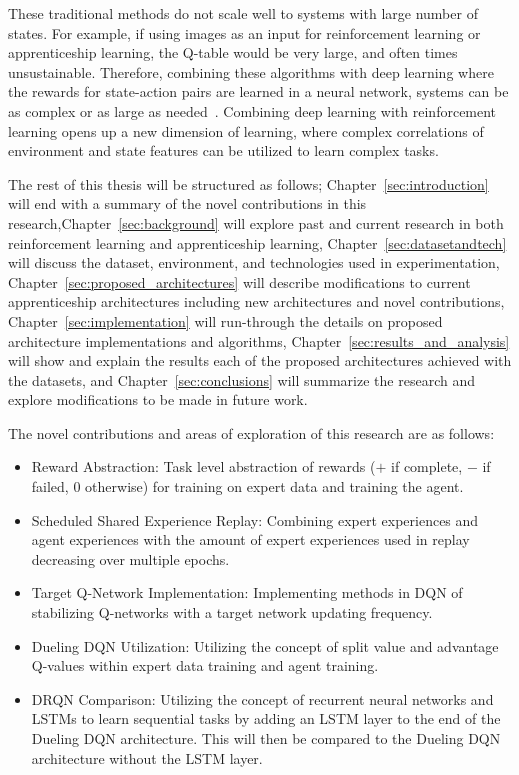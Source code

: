 \documentclass[12pt,american]{report}
\providecommand{\DIFaddtex}[1]{{\protect\color{blue}\uwave{#1}}} %
\providecommand{\DIFaddbegin}{} %
\providecommand{\DIFaddend}{} %
\providecommand{\DIFadd}[1]{\texorpdfstring{\DIFaddtex{#1}}{#1}} %
\newcommand{\DIFaddincludegraphics}[2][]{{\color{blue}\fbox{\DIFOincludegraphics[#1]{#2}}}} %
\DeclareRobustCommand{\DIFaddbegin}{\DIFOaddbegin \let\includegraphics\DIFaddincludegraphics} %
\DeclareRobustCommand{\DIFaddend}{\DIFOaddend \let\includegraphics\DIFOincludegraphics} %
\begin{document}
These traditional methods do not scale well to systems with \DIFaddbegin \DIFadd{a }\DIFaddend large number of states.  For example, if using images as an input for reinforcement learning or apprenticeship learning, the Q-table would be very large, and often times unsustainable.  Therefore, combining these algorithms with deep learning where the rewards for state-action pairs are learned in a neural network, systems can be as complex or as large as needed~\cite{matiisen_2015}. Combining deep learning with reinforcement learning opens up a new dimension of learning, where complex correlations of environment and state features can be utilized to learn complex tasks.

The rest of this thesis will be structured as follows; Chapter~\ref{sec:introduction} will end with a summary of the novel contributions in this research,Chapter~\ref{sec:background} will explore past and current research in both reinforcement learning and apprenticeship learning, Chapter~\ref{sec:datasetandtech} will discuss the dataset, environment, and technologies used in experimentation, Chapter~\ref{sec:proposed_architectures} will describe modifications to current apprenticeship architectures including new architectures and novel contributions, Chapter~\ref{sec:implementation} will run-through the details on proposed architecture implementations and algorithms, Chapter~\ref{sec:results_and_analysis} will show and explain the results each of the proposed architectures achieved with the datasets, and Chapter~\ref{sec:conclusions} will summarize the research and explore modifications to be made in future work.

The novel contributions and areas of exploration of this research are as follows:
\begin{itemize}
  \item Reward Abstraction: Task level abstraction of rewards ($+$ if complete, $-$ if failed, $0$ otherwise) for training on expert data and training the agent.
  \item Scheduled Shared Experience Replay: Combining expert experiences and agent experiences with the amount of expert experiences used in replay decreasing over multiple epochs.
  \item Target Q-Network Implementation: Implementing methods in DQN of stabilizing Q-networks with a target network updating frequency.
  \item Dueling DQN Utilization: Utilizing the concept of split value and advantage Q-values within expert data training and agent training.
  \item DRQN Comparison: Utilizing the concept of recurrent neural networks and LSTMs to learn sequential tasks by adding an LSTM layer to the end of the Dueling DQN architecture. This will then be compared to the Dueling DQN architecture without the LSTM layer.
\end{itemize}
\end{document}
